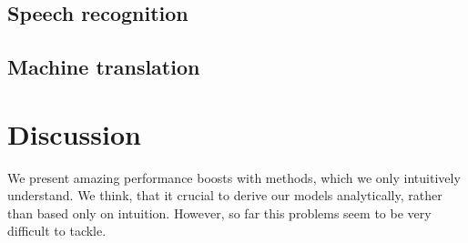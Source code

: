 \documentclass{article}
\begin{document}
\subsection{Speech recognition}
\label{sec:speech}

\subsection{Machine translation}
\label{sec:trans}

\section{Discussion}
We present amazing performance boosts with methods, which we 
only intuitively understand. We think, that it crucial
to derive our models analytically, rather than based only on
intuition. However, so far this problems seem to be very difficult to
tackle.




\end{document}
